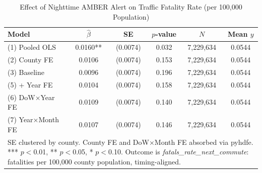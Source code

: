 \begin{table}[htbp]\centering
\caption{Effect of Nighttime AMBER Alert on Traffic Fatality Rate (per 100,000 Population)}
\begin{tabular}{lccccc}
\hline\hline
Model & $\hat\beta$ & SE & $p$-value & $N$ & Mean $y$ \\
\midrule
(1) Pooled OLS & 0.0160** & (0.0074) & 0.032 & 7,229,634 & 0.0544 \\
(2) County FE & 0.0106 & (0.0074) & 0.153 & 7,229,634 & 0.0544 \\
(3) Baseline & 0.0096 & (0.0074) & 0.196 & 7,229,634 & 0.0544 \\
(5) + Year FE & 0.0104 & (0.0074) & 0.158 & 7,229,634 & 0.0544 \\
(6) DoW×Year FE & 0.0109 & (0.0074) & 0.140 & 7,229,634 & 0.0544 \\
(7) Year×Month FE & 0.0107 & (0.0074) & 0.146 & 7,229,634 & 0.0544 \\
\hline\hline
\multicolumn{6}{p{0.9\textwidth}}{\footnotesize SE clustered by county. County FE and DoW$\times$Month FE absorbed via pyhdfe. *** $p{<}$0.01, ** $p{<}$0.05, * $p{<}$0.10. Outcome is \textit{fatals\_rate\_next\_commute}: fatalities per 100,000 county population, timing-aligned.} \\
\end{tabular}
\end{table}